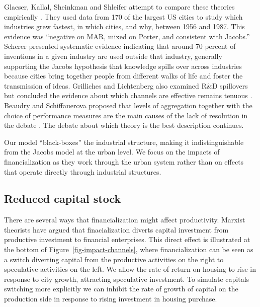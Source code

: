  Glaeser, Kallal, Sheinkman and Shleifer attempt to compare these theories empirically \cite{glaeserGrowthCities1991}. They used data from 170 of the largest US cities to study which industries grew fastest, in which cities, and why, between 1956 and 1987. %
This evidence was ``negative on MAR, mixed on Porter, and consistent with Jacobs.'' Scherer \cite{schererInterindustryTechnologyFlows1982} presented systematic evidence indicating that around 70 percent of inventions in a given industry are used outside that industry, generally supporting the Jacobs hypothesis that knowledge spills over across industries because cities bring together people from different walks of life and foster the transmission of ideas. Grilliches and Lichtenberg also examined R\&D spillovers but concluded the evidence about which channels are effective remains tenuous \cite{grilichesInterindustryTechnologyFlows1984}. Beaudry and Schiffauerova proposed that levels of aggregation together with the choice of performance measures are the main causes of the lack of resolution in the debate \cite{beaudryWhoRightMarshall2009}. The debate about which theory is the best description continues. 


Our model ``black-boxes'' the industrial structure, making it indistinguishable from the Jacobs model at the urban level. We focus on the impacts of financialization as they work through the urban system rather than on  effects that operate directly through industrial structures.
 


\subsection{Reduced capital stock}
There are several ways that financialization might affect productivity. 
Marxist theorists \cite{lefebvreRevolutionUrbaine1970, harveyClassmonopolyRentFinance1974, harveyUrbanProcessCapitalism1978, christophersRevisitingUrbanizationCapital2011} have argued that finacialization diverts capital investment from productive investment to financial enterprises. 
This direct effect is illustrated at the bottom of Figure~\ref{fig-impact-channels}, where  financialization can be seen as a switch diverting capital from the productive activities on the right to  speculative activities on the left. We allow the rate of return on housing to rise in response to city growth, attracting speculative investment. To simulate capitals switching more explicitly we can inhibit the rate of growth of capital on the production side in response to rising investment in housing purchase. %

